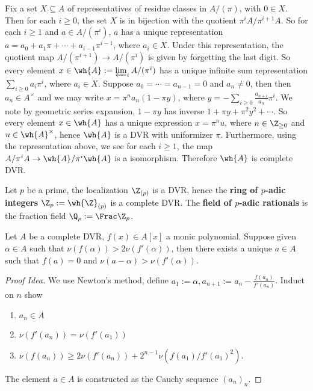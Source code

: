 \documentclass[11pt]{amsart}
\begin{document}
Fix a set $X \subseteq A$ of representatives of residue classes in $A/(\pi)$,
with $0 \in X$.  Then for each $i \geq 0$, the set $X$ is in bijection with the quotient
$\pi^i A/\pi^{i+1} A$.  So for each $i \geq 1$ and $a \in A/(\pi^i)$, $a$ has a
unique representation $a = a_0 + a_1 \pi + \cdots + a_{i-1} \pi^{i-1}$, where
$a_i \in X$.  Under this representation, the quotient map $A/(\pi^{i+1}) \to
A/(\pi^i)$ is given by forgetting the last digit.  So every element $x \in \wh{A}
:= \varprojlim_i A/(\pi^i)$ has a unique infinite sum representation $\sum_{i
    \geq 0} a_i \pi^i$, where $a_i \in X$.  Suppose $a_0 = \cdots = a_{n-1} = 0$
and $a_n \neq 0$, then then $a_n \in A^{\times}$ and we may write $x = \pi^n a_n
(1 - \pi y)$, where $y = - \sum_{i\geq 0} \frac{a_{n+i}}{a_n} \pi^i$.  We note
by geometric series expansion, $1 - \pi y$ has inverse $1 + \pi y + \pi^2 y^2 +
\cdots$.  So every element $x \in \wh{A}$ has a unique expression $x = \pi^n u$,
where $n \in \Z_{\geq 0}$ and $u \in \wh{A}^{\times}$, hence $\wh{A}$ is a DVR with
uniformizer $\pi$.
%
Furthermore, using the representation above, we see for each $i \geq 1$, the map
$A/\pi^i A \to \wh{A}/\pi^i \wh{A}$ is a isomorphism.  Therefore $\wh{A}$ is
complete DVR.

\begin{defn}
    Let $p$ be a prime, the localization $\Z_{(p)}$ is a DVR, hence the {\bf
        ring of $p$-adic integers}  $\Z_p := \wh{\Z}_{(p)}$ is a
    complete DVR.  The {\bf field of $p$-adic rationals}  is the
    fraction field $\Q_p := \Frac \Z_p$.
\end{defn}

\begin{lem}
    Let $A$ be a complete DVR, $f(x) \in A[x]$ a monic polynomial.  Suppose
    given $\alpha \in A$ such that $\nu(f(\alpha)) > 2\nu(f'(\alpha))$, then
    there exists a unique $a \in A$ such that $f(a) = 0$ and $\nu(a - \alpha) >
    \nu(f'(\alpha))$.
\end{lem}

\begin{proof}[Proof Idea]
    We use Newton's method, define $a_1 := \alpha, a_{n+1} := a_n -
    \frac{f(a_n)}{f'(a_n)}$. Induct on $n$ show
    \begin{enumerate}
        \item $a_n \in A$
        \item $\nu(f'(a_n)) = \nu(f'(a_1))$
        \item $\nu(f(a_n)) \geq 2 \nu(f'(a_n)) + 2^{n-1} \nu(f(a_1)/f'(a_1)^2)$.
    \end{enumerate}

    The element $a \in A$ is constructed as the Cauchy sequence $(a_n)_n$.
\end{proof}
\end{document}
